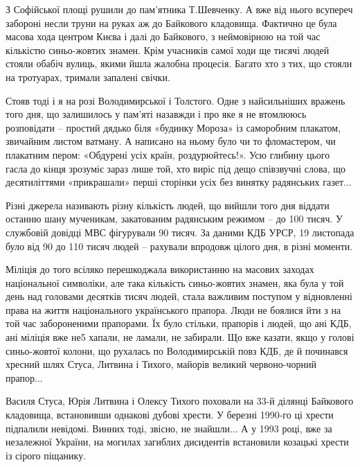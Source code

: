 З Софійської площі рушили до пам'ятника Т.Шевченку. А вже від нього всупереч
забороні несли труни на руках аж до Байкового кладовища. Фактично це була
масова хода центром Києва і далі до Байкового, з неймовірною на той час
кількістю синьо-жовтих знамен. Крім учасників самої ходи ще тисячі людей стояли
обабіч вулиць, якими йшла жалобна процесія. Багато хто з тих, що стояли на
тротуарах, тримали запалені свічки.

Стояв тоді і я на розі Володимирської і Толстого. Одне з найсильніших вражень
того дня, що залишилось у пам'яті назавжди і про яке я не втомлююсь розповідати
– простий дядько біля «будинку Мороза» із саморобним плакатом, звичайним листом
ватману. А написано на ньому було чи то фломастером, чи плакатним пером:
«Обдурені усіх країн, роздурюйтесь!». Усю глибину цього гасла до кінця зрозуміє
зараз лише той, хто виріс під дещо співзвучні слова, що десятиліттями
«прикрашали» перші сторінки усіх без винятку радянських газет...

Різні джерела називають різну кількість людей, що вийшли того дня віддати
останню шану мученикам, закатованим радянським режимом – до 100 тисяч. У
службовій довідці МВС фігурували 90 тисяч. За даними КДБ УРСР, 19 листопада
було від 90 до 110 тисяч людей – рахували впродовж цілого дня, в різні моменти.

Міліція до того всіляко перешкоджала використанню на масових заходах
національної символіки, але така кількість синьо-жовтих знамен, яка була у той
день над головами десятків тисяч людей, стала важливим поступом у відновленні
права на життя національного українського прапора. Люди не боялися йти з на той
час забороненими прапорами. Їх було стільки, прапорів і людей, що ані КДБ, ані
міліція вже не5 хапали, не ламали, не забирали. Що вже казати, якщо у голові
синьо-жовтої колони, що рухалась по Володимирській повз КДБ, де й починався
хресний шлях Стуса, Литвина і Тихого, майорів великий червоно-чорний прапор...

Василя Стуса, Юрія Литвина і Олексу Тихого поховали на 33-й ділянці Байкового
кладовища, встановивши однакові дубові хрести. У березні 1990-го ці хрести
підпалили невідомі. Винних тоді, звісно, не знайшли... А у 1993 році, вже за
незалежної України, на могилах загиблих дисидентів встановили козацькі хрести
із сірого піщанику.

